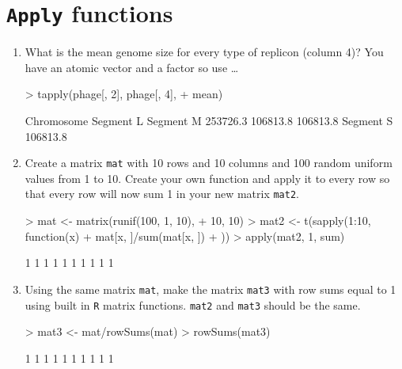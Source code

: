 \documentclass[letterpaper,12pt]{article}
\newcommand{\pl}[1]{\texttt{#1}}
\begin{document}
\section{\pl{Apply} functions}
  \begin{enumerate}
  \item What is the mean genome size for every type of replicon (column 4)? You have an atomic vector and a factor so use \ldots
\begin{Schunk}
\begin{Sinput}
> tapply(phage[, 2], phage[, 4], 
+     mean)
\end{Sinput}
\begin{Soutput}
Chromosome  Segment L  Segment M 
  253726.3   106813.8   106813.8 
 Segment S 
  106813.8 
\end{Soutput}
\end{Schunk}
  \item Create a matrix \pl{mat} with 10 rows and 10 columns and 100 random uniform values from 1 to 10. Create your own function and apply it to every row so that every row will now sum 1 in your new matrix \pl{mat2}.
\begin{Schunk}
\begin{Sinput}
> mat <- matrix(runif(100, 1, 10), 
+     10, 10)
> mat2 <- t(sapply(1:10, function(x) {
+     mat[x, ]/sum(mat[x, ])
+ }))
> apply(mat2, 1, sum)
\end{Sinput}
\begin{Soutput}
 [1] 1 1 1 1 1 1 1 1 1 1
\end{Soutput}
\end{Schunk}
  \item Using the same matrix \pl{mat}, make the matrix \pl{mat3} with row sums equal to 1 using built in \pl{R} matrix functions. \pl{mat2} and \pl{mat3} should be the same.
\begin{Schunk}
\begin{Sinput}
> mat3 <- mat/rowSums(mat)
> rowSums(mat3)
\end{Sinput}
\begin{Soutput}
 [1] 1 1 1 1 1 1 1 1 1 1
\end{Soutput}
\end{Schunk}
  \end{enumerate}
\end{document}
